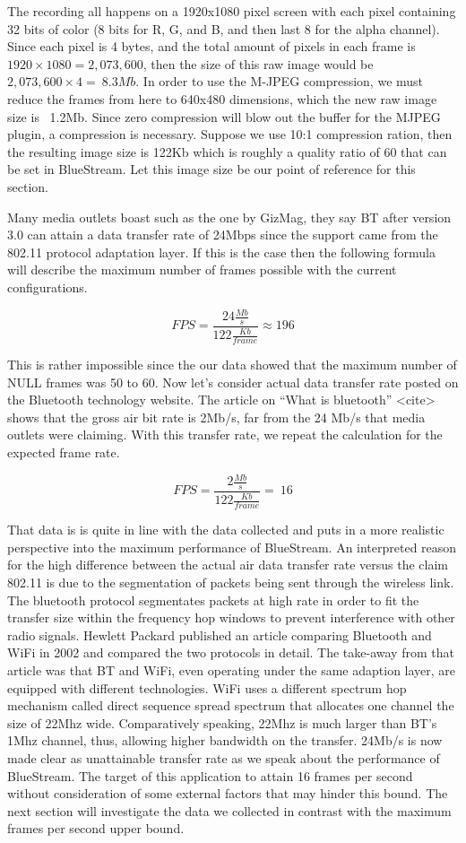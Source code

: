 \documentclass[a4paper,12pt]{article}
\begin{document}
The recording all happens on a 1920x1080 pixel screen with each pixel containing 32 bits of color (8 bits for R, G, and B, and then last 8 for the alpha channel). Since each pixel is 4 bytes, and the total amount of pixels in each frame is $1920\times 1080 = 2,073,600$, then the size of this raw image would be$ 2,073,600\times 4 = ~8.3Mb$. In order to use the M-JPEG compression, we must reduce the frames from here to 640x480 dimensions, which the new raw image size is ~1.2Mb. Since zero compression will blow out the buffer for the MJPEG plugin, a compression is necessary. Suppose we use 10:1 compression ration, then the resulting image size is 122Kb which is roughly a quality ratio of 60 that can be set in BlueStream. Let this image size be our point of reference for this section.

Many media outlets boast such as the one by GizMag, they say BT after version 3.0 can attain a data transfer rate of 24Mbps \cite{GizMag} since the support came from the 802.11 protocol adaptation layer. If this is the case then the following formula will describe the maximum number of frames possible with the current configurations.

$$FPS = \frac{24\frac{Mb}{s}}{122\frac{Kb}{frame}} \approx 196$$

This is rather impossible since the our data showed that the maximum number of NULL frames was 50 to 60. Now let’s consider actual data transfer rate posted on the Bluetooth technology website. The article on “What is bluetooth” <cite> shows that the gross air bit rate is 2Mb/s, far from the 24 Mb/s that media outlets were claiming. With this transfer rate, we repeat the calculation for the expected frame rate.

$$FPS = \frac{2\frac{Mb}{s}}{122\frac{Kb}{frame}} = ~ 16 $$

That data is is quite in line with the data collected and puts in a more realistic perspective into the maximum performance of BlueStream. An interpreted reason for the high difference between the actual air data transfer rate versus the claim 802.11 is due to the segmentation of packets being sent through the wireless link. The bluetooth protocol segmentates packets at high rate in order to fit the transfer size within the frequency hop windows to prevent interference with other radio signals. Hewlett Packard published an article comparing Bluetooth and WiFi in 2002 and compared the two protocols in detail. The take-away from that article was that BT and WiFi, even operating under the same adaption layer, are equipped with different technologies. WiFi uses a different spectrum hop mechanism called direct sequence spread spectrum that allocates one channel the size of 22Mhz wide. Comparatively speaking, 22Mhz is much larger than BT’s 1Mhz channel, thus, allowing higher bandwidth on the transfer. 24Mb/s is now made clear as unattainable transfer rate as we speak about the performance of BlueStream. The target of this application to attain 16 frames per second without consideration of some external factors that may hinder this bound. The next section will investigate the data we collected in contrast with the maximum frames per second upper bound. 
\end{document}
